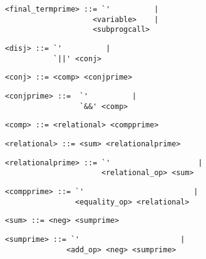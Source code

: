 \begin{footnotesize}
\begin{lstlisting}[frame=single, label={final_termprime}, language=pie]
<final_termprime> ::= `'          |
                    <variable>    |
                    <subprogcall>
\end{lstlisting}

\begin{lstlisting}[frame=single, label={disj}, language=pie]
<disj> ::= `'          |
           `||' <conj>
\end{lstlisting}

\begin{lstlisting}[frame=single, label={conj}, language=pie]
<conj> ::= <comp> <conjprime>
\end{lstlisting}

\begin{lstlisting}[frame=single, label={conjprime}, language=pie]
<conjprime> ::=  `'          |
                 `&&' <comp>
\end{lstlisting}

\begin{lstlisting}[frame=single, label={comp}, language=pie]
<comp> ::= <relational> <compprime>
\end{lstlisting}

\begin{lstlisting}[frame=single, label={relational}, language=pie]
<relational> ::= <sum> <relationalprime>
\end{lstlisting}

\begin{lstlisting}[frame=single, label={relationalprime}, language=pie]
<relationalprime> ::= `'                    |
                      <relational_op> <sum>
\end{lstlisting}

\begin{lstlisting}[frame=single, label={compprime}, language=pie]
<compprime> ::= `'                         |
                <equality_op> <relational>
\end{lstlisting}

\begin{lstlisting}[frame=single, label={sum}, language=pie]
<sum> ::= <neg> <sumprime>
\end{lstlisting}

\begin{lstlisting}[frame=single, label={sumprime}, language=pie]
<sumprime> ::= `'                       |
              <add_op> <neg> <sumprime>
\end{lstlisting}


\end{footnotesize}
